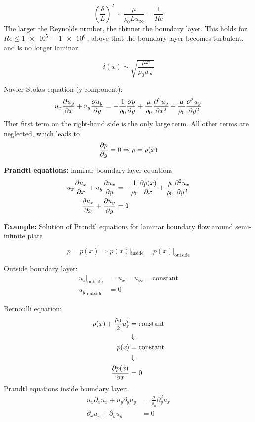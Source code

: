\begin{equation}
\left(\frac{\delta}{L}\right)^2 \sim \frac{\mu}{\rho_0 L u_\infty} = \frac{1}{Re}
\end{equation}
The larger the Reynolds number, the thinner the boundary layer. This holds for $Re \leq \SI{1e5}{}-\SI{1e6}{}$, above that the boundary layer becomes turbulent, and is no longer laminar.

\begin{equation}
\delta(x) \sim \sqrt{\frac{\mu x}{\rho_0 u_\infty}}
\end{equation}

Navier-Stokes equation (y-component):
\begin{equation}
u_x\frac{\partial u_y}{\partial x} + u_y\frac{\partial u_y}{\partial y} = -\frac{1}{\rho_0}\frac{\partial p}{\partial y} + \frac{\mu}{\rho_0}\frac{\partial^2 u_y}{\partial x^2} + \frac{\mu}{\rho_0}\frac{\partial^2 u_y}{\partial y^2}
\end{equation}
Ther first term on the right-hand side is the only large term. All other terms are neglected, which leads to
\begin{equation}
\frac{\partial p}{\partial y} = 0 \Rightarrow p = p(x)
\end{equation}

\begin{framed}
\textbf{Prandtl equations:} laminar boundary layer equations
\begin{align}
u_x\frac{\partial u_x}{\partial x}+u_y\frac{\partial u_x}{\partial y} &= -\frac{1}{\rho_0}\frac{\partial p(x)}{\partial x}+\frac{\mu}{\rho_0}\frac{\partial^2 u_x}{\partial y^2} \\
\frac{\partial u_x}{\partial x}+\frac{\partial u_y}{\partial y}&=0
\end{align}
\end{framed}

\textbf{Example:} Solution of Prandtl equations for laminar boundary flow around semi-infinite plate

\begin{equation}
p=p(x) \Rightarrow p(x)|_\mathrm{inside} = p(x)|_\mathrm{outside}
\end{equation}

Outside boundary layer:
\begin{align}
u_x|_\mathrm{outside} &= u_x = u_\infty = \mathrm{constant} \\
u_y|_\mathrm{outside} &= 0
\end{align}

Bernoulli equation:
\begin{align}
p(x) + \frac{\rho_0}{2}u_x^2 &= \mathrm{constant}\\
&\Downarrow\notag\\
p(x) &= \mathrm{constant} \\
&\Downarrow\notag\\
\frac{\partial p(x)}{\partial x} &= 0
\end{align}
Prandtl equations inside boundary layer:
\begin{align}
u_x\partial_xu_x+u_y\partial_yu_y &= \frac{\mu}{\rho_0}\partial_y^2u_x\\
\partial_xu_x+\partial_yu_y &= 0
\end{align}

